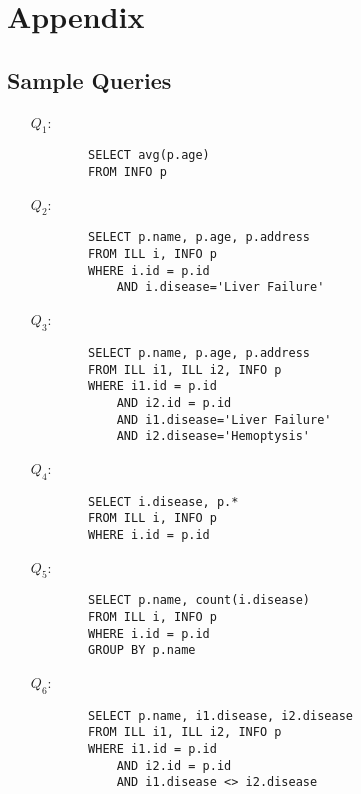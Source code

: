 
\section{Appendix}
\label{app}

\subsection{Sample Queries}
\label{app:queries}

\begin{itemize}

    \item[$Q_1$:] \begin{verbatim}
        SELECT avg(p.age)
        FROM INFO p
    \end{verbatim}

    \item[$Q_2$:] \begin{verbatim}
        SELECT p.name, p.age, p.address 
        FROM ILL i, INFO p 
        WHERE i.id = p.id 
            AND i.disease='Liver Failure'
    \end{verbatim}
    
    \item[$Q_3$:] \begin{verbatim}
        SELECT p.name, p.age, p.address 
        FROM ILL i1, ILL i2, INFO p 
        WHERE i1.id = p.id 
            AND i2.id = p.id 
            AND i1.disease='Liver Failure' 
            AND i2.disease='Hemoptysis'
    \end{verbatim}

    \item[$Q_4$:] \begin{verbatim}
        SELECT i.disease, p.* 
        FROM ILL i, INFO p 
        WHERE i.id = p.id
    \end{verbatim}
   
    \item[$Q_5$:] \begin{verbatim}
        SELECT p.name, count(i.disease) 
        FROM ILL i, INFO p 
        WHERE i.id = p.id 
        GROUP BY p.name 
    \end{verbatim}

    \item[$Q_6$:] \begin{verbatim}
        SELECT p.name, i1.disease, i2.disease 
        FROM ILL i1, ILL i2, INFO p 
        WHERE i1.id = p.id 
            AND i2.id = p.id 
            AND i1.disease <> i2.disease
    \end{verbatim}


\end{itemize}
\newpage

